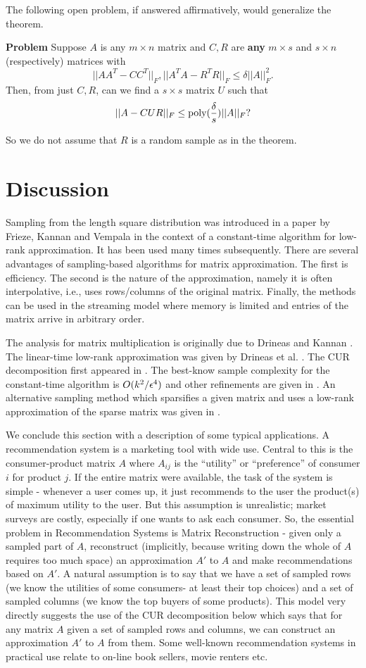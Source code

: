 \documentclass{book}
\numberwithin{exercise}{chapter}
\begin{document}
The following open problem, if answered affirmatively, would generalize the theorem.

{\bf Problem} Suppose $A$ is any $m\times n$ matrix and $C,R$ are {\bf any} $m\times s$ and $s\times n$ (respectively) matrices with
$$||AA^T-CC^T||_F, ||A^TA-R^TR||_F\leq \delta ||A||_F^2.$$
Then, from just $C,R$, can we find a $s\times s$ matrix $U$ such that
$$||A-CUR||_F\leq \hbox{poly}(\frac{\delta}{s})||A||_F?$$

So we do not assume that $R$ is a random sample as in the theorem.

\section{Discussion}
Sampling from the length square distribution was introduced in a paper by Frieze, Kannan and Vempala \cite{FKV-focs98, FKV04} in the context of a constant-time algorithm for low-rank approximation. It has been used many times subsequently. There are several advantages of sampling-based algorithms for matrix approximation. The first is efficiency. The second is the nature of the approximation, namely it is often interpolative, i.e., uses rows/columns of the original matrix. Finally, the methods can be used in the streaming model where memory is limited and entries of the matrix arrive in arbitrary order.

The analysis for matrix multiplication is originally due to Drineas and Kannan \cite{DK2001}. The linear-time low-rank approximation was given by Drineas et al. \cite{DFKVV04}. The CUR decomposition first appeared in \cite{DK2003}. The best-know sample complexity for the constant-time algorithm is $O(k^2/\epsilon^4)$ and other refinements are given in \cite{DKM1, DKM2, DKM3}. An alternative sampling method which sparsifies a given matrix and uses a low-rank approximation of the sparse matrix was given in \cite{AM2007}.

We conclude this section with a description of some typical applications.
A recommendation system is a marketing tool with wide use. Central to
this is the consumer-product matrix $A$ where $A_{ij}$ is the
``utility'' or ``preference'' of consumer $i$ for product $j$. If the
entire matrix were available, the task of the system is simple -
whenever a user comes up, it just recommends to the user the
product(s) of maximum utility to the user. But this assumption is
unrealistic; market surveys are costly, especially if one wants to ask
each consumer. So, the essential problem in Recommendation Systems is
Matrix Reconstruction - given only a sampled part of $A$, reconstruct
(implicitly, because writing down the whole of $A$ requires too much
space) an approximation $A'$ to $A$ and make recommendations based on $A'$.
A natural assumption is to say that we have a set of sampled rows (we
know the utilities of some consumers- at least their top choices) and
a set of sampled columns (we know the top buyers of some products).
This model very directly suggests the use of the
CUR decomposition below which says that for any matrix $A$ given a set
of sampled rows and columns, we can construct an approximation $A'$ to $A$
from them. Some well-known recommendation systems in practical use relate to
on-line book sellers, movie renters etc.
\end{document}
